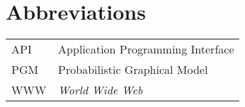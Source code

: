 \chapter*{Abbreviations}

\begin{flushleft}
\begin{tabular}{l p{0.8\linewidth}}
API      & Application Programming Interface\\
PGM      & Probabilistic Graphical Model\\
WWW      & \emph{World Wide Web}
\end{tabular}
\end{flushleft}
